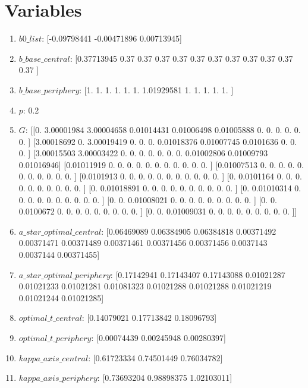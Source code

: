 \documentclass{article}
\begin{document}
\section{Variables}
\begin{enumerate}
\item $b0\_list$: [-0.09798441 -0.00471896  0.00713945]
\item $b\_base\_central$: [0.37713945 0.37       0.37       0.37       0.37       0.37
 0.37       0.37       0.37       0.37       0.37       0.37      ]
\item $b\_base\_periphery$: [1.         1.         1.         1.         1.         1.
 1.01929581 1.         1.         1.         1.         1.        ]
\item $p$: 0.2
\item $G$: [[0.         3.00001984 3.00004658 0.01014431 0.01006498 0.01005888
  0.         0.         0.         0.         0.         0.        ]
 [3.00018692 0.         3.00019419 0.         0.         0.
  0.01018376 0.01007745 0.0101636  0.         0.         0.        ]
 [3.00015503 3.00003422 0.         0.         0.         0.
  0.         0.         0.         0.01002806 0.01009793 0.01016946]
 [0.01011919 0.         0.         0.         0.         0.
  0.         0.         0.         0.         0.         0.        ]
 [0.01007513 0.         0.         0.         0.         0.
  0.         0.         0.         0.         0.         0.        ]
 [0.0101913  0.         0.         0.         0.         0.
  0.         0.         0.         0.         0.         0.        ]
 [0.         0.0101164  0.         0.         0.         0.
  0.         0.         0.         0.         0.         0.        ]
 [0.         0.01018891 0.         0.         0.         0.
  0.         0.         0.         0.         0.         0.        ]
 [0.         0.01010314 0.         0.         0.         0.
  0.         0.         0.         0.         0.         0.        ]
 [0.         0.         0.01008021 0.         0.         0.
  0.         0.         0.         0.         0.         0.        ]
 [0.         0.         0.0100672  0.         0.         0.
  0.         0.         0.         0.         0.         0.        ]
 [0.         0.         0.01009031 0.         0.         0.
  0.         0.         0.         0.         0.         0.        ]]
\item $a\_star\_optimal\_central$: [0.06469089 0.06384905 0.06384818 0.00371492 0.00371471 0.00371489
 0.00371461 0.00371456 0.00371456 0.0037143  0.0037144  0.00371455]
\item $a\_star\_optimal\_periphery$: [0.17142941 0.17143407 0.17143088 0.01021287 0.01021233 0.01021281
 0.01081323 0.01021288 0.01021288 0.01021219 0.01021244 0.01021285]
\item $optimal\_t\_central$: [0.14079021 0.17713842 0.18096793]
\item $optimal\_t\_periphery$: [0.00074439 0.00245948 0.00280397]
\item $kappa\_axis\_central$: [0.61723334 0.74501449 0.76034782]
\item $kappa\_axis\_periphery$: [0.73693204 0.98898375 1.02103011]
\end{enumerate}
\end{document}
